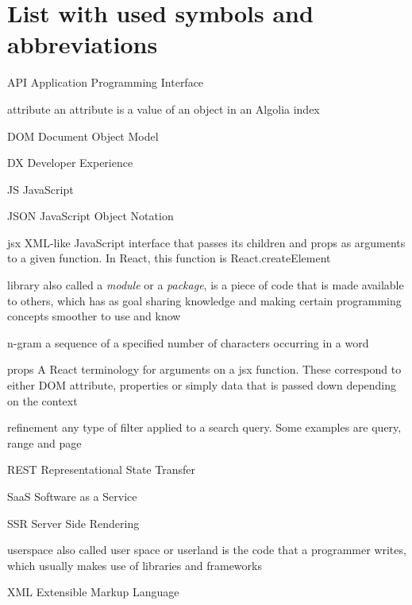 
\chapter{List with used symbols and abbreviations}

\begin{abbreviations}
\item[API] Application Programming Interface
\item[attribute] an attribute is a value of an object in an Algolia index
\item[DOM] Document Object Model
\item[DX] Developer Experience
\item[JS] JavaScript
\item[JSON] JavaScript Object Notation
\item[jsx] XML-like JavaScript interface that passes its children and props as arguments to a given function. In React, this function is React.createElement
\item[library] also called a \emph{module} or a \emph{package}, is a piece of code that is made available to others, which has as goal sharing knowledge and making certain programming concepts smoother to use and know
\item[n-gram] a sequence of a specified number of characters occurring in a word\cite{kimbrell1988searching}
\item[props] A React terminology for arguments on a jsx function. These correspond to either DOM attribute, properties or simply data that is passed down depending on the context
\item[refinement] any type of filter applied to a search query. Some examples are query, range and page
\item[REST] Representational State Transfer\cite{fielding2000architectural}
\item[SaaS] Software as a Service
\item[SSR] Server Side Rendering
\item[userspace] also called user space or userland is the code that a programmer writes, which usually makes use of libraries and frameworks
\item[XML] Extensible Markup Language
\end{abbreviations}
